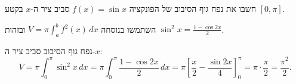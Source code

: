 
\begin{question}
חשבו את נפח גוף הסיבוב של הפונקציה $f(x)=\sin x$ סביב ציר ה-$x$ בקטע $[0,\pi]$.
\end{question}

\begin{hint}
השתמשו בנוסחה $V=\pi\int_a^b f^2(x)\,dx$ ובזהות $\sin^2x=\frac{1-\cos2x}{2}$.
\end{hint}

\begin{solution}
נפח גוף הסיבוב סביב ציר ה-$x$:
\[ V=\pi\int_0^\pi\sin^2x\,dx=\pi\int_0^\pi\frac{1-\cos2x}{2}\,dx=\pi\left[\frac x2-\frac{\sin2x}{4}\right]_0^\pi=\pi\cdot\frac\pi2=\boxed{\frac{\pi^2}{2}}. \]
\end{solution}
